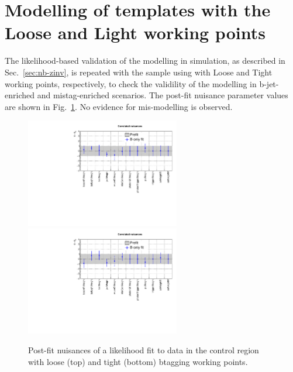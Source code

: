 
\section{Modelling of \texorpdfstring{\nb}{Nb} templates with the
  Loose and Light working points}
\label{app:nb_validation_LT}

The likelihood-based validation of the \nb modelling in simulation, as
described in Sec.~\ref{sec:nb-zinv}, is repeated with the \mmj sample
using with Loose and Tight working points, respectively, to check the
validility of the \nb modelling in b-jet-enriched and mistag-enriched
scenarios. The post-fit nuisance parameter values are shown in
Fig.~\ref{fig:loose_tight_nb}. No evidence for mis-modelling is
observed. 

\begin{figure}[h!]
  \centering
  \includegraphics[width=0.6\textwidth]{figures/btag/nuisances/full/Correlated_nuisances_loose}
  \includegraphics[width=0.6\textwidth]{figures/btag/nuisances/full/Correlated_nuisances_tight}
  \caption{Post-fit nuisances of a likelihood fit to data in the \mmj
    control region with loose (top) and tight (bottom) btagging
    working points. }
  \label{fig:loose_tight_nb}
\end{figure}

